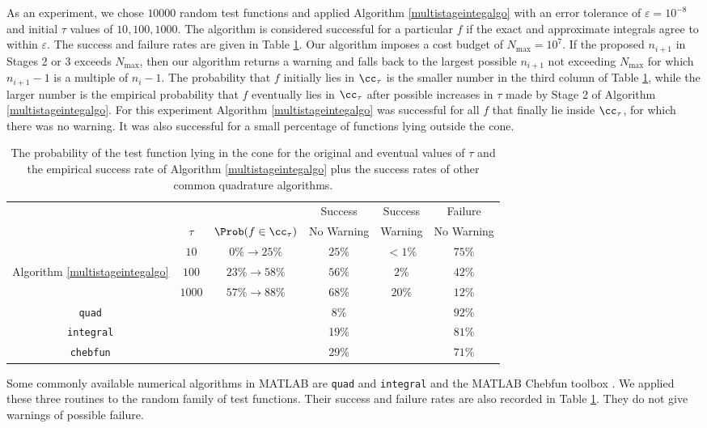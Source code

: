 As an experiment, we chose $10000$ random test functions and applied Algorithm \ref{multistageintegalgo} with an error tolerance of  $\varepsilon = 10^{-8}$ and initial $\tau$ values of $10, 100, 1000$.  The algorithm is considered successful for a particular $f$ if the exact and approximate integrals agree to within $\varepsilon$. The success and failure rates are given in Table \ref{integresultstable}. Our algorithm imposes a cost budget of $N_{\max}=10^7$.  If the proposed $n_{i+1}$ in Stages 2 or 3 exceeds $N_{\max}$, then our algorithm returns a warning and falls back to the largest possible $n_{i+1}$ not exceeding $N_{\max}$ for which $n_{i+1}-1$ is a multiple of $n_i-1$.  The probability that $f$ initially lies in $\cc_{\tau}$ is the smaller number in the third column of Table \ref{integresultstable}, while the larger number is the empirical probability that $f$ eventually lies in $\cc_{\tau}$ after possible increases in $\tau$ made by Stage 2 of Algorithm \ref{multistageintegalgo}.  For this experiment Algorithm \ref{multistageintegalgo} was successful for all $f$ that finally lie inside $\cc_{\tau}$, for which there was no warning.  It was also successful for a small percentage of functions lying outside the cone.

\begin{table}[h]
\centering
\begin{tabular}{cccccc}
&&&Success & Success & Failure \\
& $\tau$ &  $\Prob(f \in \cc_{\tau}) $ & No Warning & Warning & No Warning \\
\toprule
&$10$ & $0\% \rightarrow  25\% $ & $25\%$ & $<1\%$ & $75\%$  \\
Algorithm \ref{multistageintegalgo}
 &$100$ & $23 \% \rightarrow 58\% $ & $56\%$ & $2\%$ & $42\%$ \\
&$1000$ & $57\% \rightarrow 88\% $& $68\%$ & $20\%$ &$12\%$ \\
\midrule
{\tt quad} & & & 8\% & & $92\%$\\
{\tt integral} & & & 19\% & & $81\%$\\
{\tt chebfun} & & &29\% & & $71\%$\\
\end{tabular}
\caption{The probability of the test function lying in the cone for the original and eventual values of $\tau$ and the empirical success rate of Algorithm \ref{multistageintegalgo} plus the success rates of other common quadrature algorithms. \label{integresultstable}}
\end{table}

Some commonly available numerical algorithms in MATLAB are {\tt quad} and {\tt integral} \cite{MAT8.1} and the MATLAB Chebfun toolbox \cite{TrefEtal12}. We applied these three routines to the random family of test functions.  Their success and failure rates are also recorded in Table \ref{integresultstable}.  They do not give warnings of possible failure.